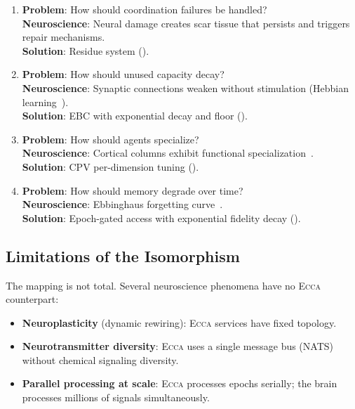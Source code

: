 \documentclass[11pt,twocolumn]{article}
\theoremstyle{definition}
\theoremstyle{plain}
\theoremstyle{remark}
\newcommand{\ecca}{\textsc{Ecca}}
\begin{document}
\begin{enumerate}[leftmargin=*]
  \item \textbf{Problem}: How should coordination failures be handled?\\
  \textbf{Neuroscience}: Neural damage creates scar tissue that persists and triggers repair mechanisms.\\
  \textbf{Solution}: Residue system ().

  \item \textbf{Problem}: How should unused capacity decay?\\
  \textbf{Neuroscience}: Synaptic connections weaken without stimulation (Hebbian learning~\cite{hebb1949organization}).\\
  \textbf{Solution}: EBC with exponential decay and floor ().

  \item \textbf{Problem}: How should agents specialize?\\
  \textbf{Neuroscience}: Cortical columns exhibit functional specialization~\cite{mountcastle1997columnar}.\\
  \textbf{Solution}: CPV per-dimension tuning ().

  \item \textbf{Problem}: How should memory degrade over time?\\
  \textbf{Neuroscience}: Ebbinghaus forgetting curve~\cite{ebbinghaus1885memory}.\\
  \textbf{Solution}: Epoch-gated access with exponential fidelity decay ().
\end{enumerate}

\subsection{Limitations of the Isomorphism}

The mapping is not total. Several neuroscience phenomena have no \ecca{} counterpart:
\begin{itemize}[leftmargin=*,itemsep=2pt]
  \item \textbf{Neuroplasticity} (dynamic rewiring): \ecca{} services have fixed topology.
  \item \textbf{Neurotransmitter diversity}: \ecca{} uses a single message bus (NATS) without chemical signaling diversity.
  \item \textbf{Parallel processing at scale}: \ecca{} processes epochs serially; the brain processes millions of signals simultaneously.
\end{itemize}
\end{document}
